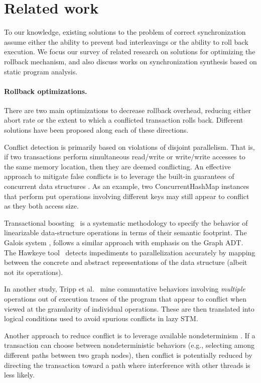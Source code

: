 \section{Related work}
To our knowledge, existing solutions to the problem of correct synchronization assume either the ability to prevent bad interleavings or the ability to roll back execution. We focus our survey of related research on solutions for optimizing the rollback mechanism, and also discuss works on synchronization synthesis based on static program analysis.

\paragraph{Rollback optimizations.}
There are two main optimizations to decrease rollback overhead, reducing either abort rate or the extent to which a conflicted transaction rolls back. Different solutions have been proposed along each of these directions.

Conflict detection is primarily based on violations of disjoint parallelism. That is, if two transactions perform simultaneous read/write or write/write accesses to the same memory location, then they are deemed conflicting. 
%
An effective approach to mitigate false conflicts is to leverage the built-in guarantees of concurrent data structures \cite{ppopp/HerlihyK08,Galois,TYFS:OOPSLA11}. As an example, two {\sf ConcurrentHashMap} instances that perform {\sf put} operations involving different keys may still appear to conflict as they both access {\sf size}.

Transactional boosting~\cite{ppopp/HerlihyK08} is a systematic methodology to specify the behavior of linearizable data-structure operations in terms of their semantic footprint. The Galois system \cite{Galois}, follows a similar approach with emphasis on the {\sf Graph} ADT. The Hawkeye tool~\cite{TYFS:OOPSLA11} detects impediments to parallelization accurately by mapping between the concrete and abstract representations of the data structure (albeit not its operations).

In another study, Tripp et al.~\cite{TMFS:PLDI12} mine commutative behaviors involving \emph{multiple} operations out of execution traces of the program that appear to conflict when viewed at the granularity of individual operations. These are then translated into logical conditions used to avoid spurious conflicts in lazy STM.

Another approach to reduce conflict is to leverage available nondeterminism \cite{TKS:OOPSLA13}. If a transaction can choose between nondeterministic behaviors (e.g., selecting among different paths between two graph nodes), then conflict is potentially reduced by directing the transaction toward a path where interference with other threads is less likely.

